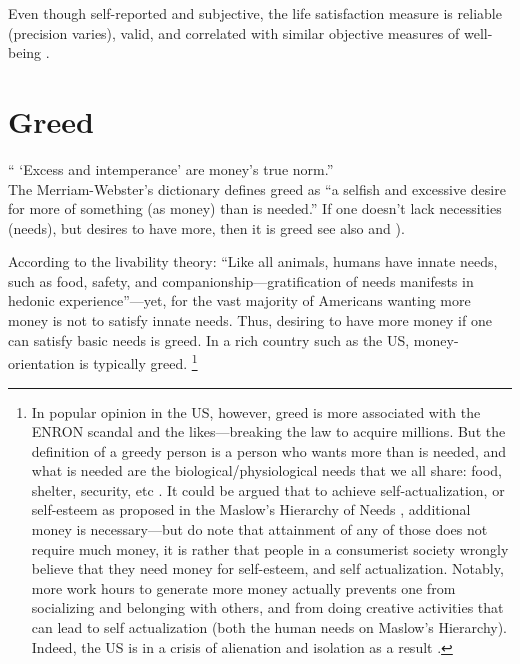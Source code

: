 \documentclass[10pt, letterpaper]{article}
\begin{document}
\begin{spacing}{1.8}
Even though self-reported and subjective, the life satisfaction measure is reliable
(precision varies), valid, and correlated with similar objective measures of
well-being \citep{myers00,layard05}.


\section{\label{g}Greed}





\noindent `` `Excess and intemperance' are money's true norm.'' \citep{marx1844-human-requirements}\\

The Merriam-Webster's dictionary defines greed as ``a selfish and excessive desire for more of something (as money) than is needed.''  
 If one doesn't lack necessities (needs), but desires to have more, then it is greed%
   see also \citet{seuntjens15b}%
   and %
   \citet{wang11b}).%

 According to the  livability theory:
 ``Like all animals, humans have innate needs, such as food, safety, and
 companionship---gratification of needs manifests in hedonic
 experience''\citep{veenhoven14b}---yet, for the vast majority of Americans wanting
 more money is not to satisfy innate needs.
%
 Thus, desiring to have more money if one can
 satisfy basic needs is greed. In a rich country such as the US, money-orientation is typically greed.
 \footnote{In popular opinion in the US, however,
   greed is more associated with the ENRON scandal and the likes---breaking the
   law to acquire millions. But the definition of a greedy person is a
   person who wants more than is needed, and what is needed are the
   biological/physiological needs that we all share: food, shelter, security,
   etc \citep{veenhoven14b}. It could be argued that to achieve
   self-actualization, or self-esteem as proposed in the Maslow's Hierarchy of Needs \citep{maslow87}, additional money is necessary---but do note that attainment of any of those does not require much money, it is rather that people in a consumerist society wrongly believe that they need money for self-esteem, and self actualization. 
Notably, more work hours to generate more money actually prevents one from socializing and belonging with others, and from doing creative activities that can lead to self actualization (both the human needs on Maslow's Hierarchy). Indeed, the US is in a crisis of alienation and isolation as a result \citep{putnam01,wilkinson09}.}


\end{spacing}
\end{document}
